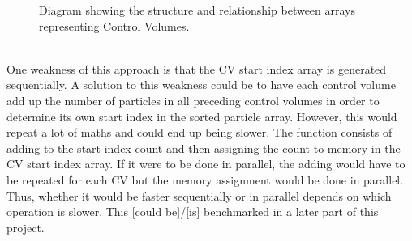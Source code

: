 \documentclass[10pt,a4paper,titlepage]{report}
\begin{document}
\begin{figure}[!ht]

\caption{Diagram showing the structure and relationship between arrays representing Control Volumes.}
\label{fig:cv_array_structure}
\end{figure}
\\One weakness of this approach is that the CV start index array is generated sequentially. A solution to this weakness could be to have each control volume add up the number of particles in all preceding control volumes in order to determine its own start index in the sorted particle array. However, this would repeat a lot of maths and could end up being slower. The function consists of adding to the start index count and then assigning the count to memory in the CV start index array. If it were to be done in parallel, the adding would have to be repeated for each CV but the memory assignment would be done in parallel. Thus, whether it would be faster sequentially or in parallel depends on which operation is slower. This [could be]/[is] benchmarked in a later part of this project. %
\end{document}
